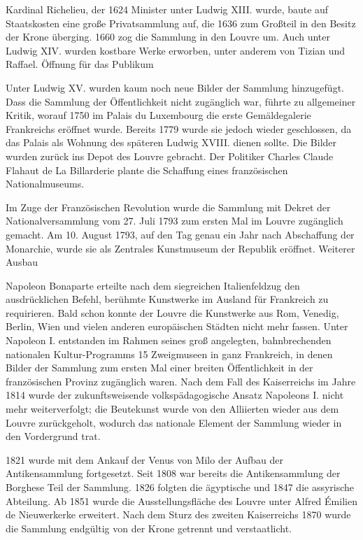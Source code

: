 \documentclass[
  letterpaper,
]{book}
\begin{document}
Kardinal Richelieu, der 1624 Minister unter Ludwig XIII. wurde, baute
auf Staatskosten eine große Privatsammlung auf, die 1636 zum Großteil in
den Besitz der Krone überging. 1660 zog die Sammlung in den Louvre um.
Auch unter Ludwig XIV. wurden kostbare Werke erworben, unter anderem von
Tizian und Raffael. Öffnung für das Publikum

Unter Ludwig XV. wurden kaum noch neue Bilder der Sammlung hinzugefügt.
Dass die Sammlung der Öffentlichkeit nicht zugänglich war, führte zu
allgemeiner Kritik, worauf 1750 im Palais du Luxembourg die erste
Gemäldegalerie Frankreichs eröffnet wurde. Bereits 1779 wurde sie jedoch
wieder geschlossen, da das Palais als Wohnung des späteren Ludwig XVIII.
dienen sollte. Die Bilder wurden zurück ins Depot des Louvre gebracht.
Der Politiker Charles Claude Flahaut de La Billarderie plante die
Schaffung eines französischen Nationalmuseums.

Im Zuge der Französischen Revolution wurde die Sammlung mit Dekret der
Nationalversammlung vom 27. Juli 1793 zum ersten Mal im Louvre
zugänglich gemacht. Am 10. August 1793, auf den Tag genau ein Jahr nach
Abschaffung der Monarchie, wurde sie als Zentrales Kunstmuseum der
Republik eröffnet. Weiterer Ausbau

Napoleon Bonaparte erteilte nach dem siegreichen Italienfeldzug den
ausdrücklichen Befehl, berühmte Kunstwerke im Ausland für Frankreich zu
requirieren. Bald schon konnte der Louvre die Kunstwerke aus Rom,
Venedig, Berlin, Wien und vielen anderen europäischen Städten nicht mehr
fassen. Unter Napoleon I. entstanden im Rahmen seines groß angelegten,
bahnbrechenden nationalen Kultur-Programms 15 Zweigmuseen in ganz
Frankreich, in denen Bilder der Sammlung zum ersten Mal einer breiten
Öffentlichkeit in der französischen Provinz zugänglich waren. Nach dem
Fall des Kaiserreichs im Jahre 1814 wurde der zukunftsweisende
volkspädagogische Ansatz Napoleons I. nicht mehr weiterverfolgt; die
Beutekunst wurde von den Alliierten wieder aus dem Louvre zurückgeholt,
wodurch das nationale Element der Sammlung wieder in den Vordergrund
trat.

1821 wurde mit dem Ankauf der Venus von Milo der Aufbau der
Antikensammlung fortgesetzt. Seit 1808 war bereits die Antikensammlung
der Borghese Teil der Sammlung. 1826 folgten die ägyptische und 1847 die
assyrische Abteilung. Ab 1851 wurde die Ausstellungsfläche des Louvre
unter Alfred Émilien de Nieuwerkerke erweitert. Nach dem Sturz des
zweiten Kaiserreichs 1870 wurde die Sammlung endgültig von der Krone
getrennt und verstaatlicht.
\end{document}
